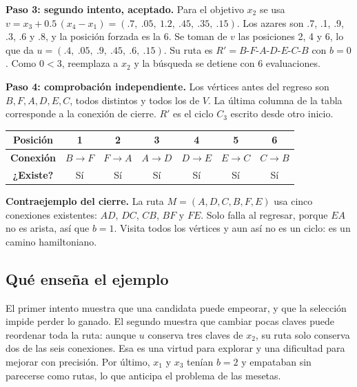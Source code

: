 \documentclass[letterpaper,12pt]{report}
\begin{document}
\noindent\textbf{Paso 3: segundo intento, aceptado.} Para el objetivo $x_2$ se usa $v=x_3+0.5\,(x_4-x_1)=(.7,\ .05,\ 1.2,\ .45,\ .35,\ .15)$. Los azares son .7, .1, .9, .3, .6 y .8, y la posición forzada es la 6. Se toman de $v$ las posiciones 2, 4 y 6, lo que da $u=(.4,\ .05,\ .9,\ .45,\ .6,\ .15)$. Su ruta es $R'=B\text{-}F\text{-}A\text{-}D\text{-}E\text{-}C\text{-}B$ con $b=0$. Como $0<3$, reemplaza a $x_2$ y la búsqueda se detiene con 6 evaluaciones.

\noindent\textbf{Paso 4: comprobación independiente.} Los vértices antes del regreso son $B,F,A,D,E,C$, todos distintos y todos los de $V$. La última columna de la tabla corresponde a la conexión de cierre. $R'$ es el ciclo $C_3$ escrito desde otro inicio.

\begin{center}
\small
\begin{tabular}{ccccccc}
\toprule
\textbf{Posición} & 1 & 2 & 3 & 4 & 5 & 6\\
\midrule
\textbf{Conexión} & $B\!\to\!F$ & $F\!\to\!A$ & $A\!\to\!D$ & $D\!\to\!E$ & $E\!\to\!C$ & $C\!\to\!B$\\
\textbf{¿Existe?} & Sí & Sí & Sí & Sí & Sí & Sí\\
\bottomrule
\end{tabular}
\end{center}

\noindent\textbf{Contraejemplo del cierre.} La ruta $M=(A,D,C,B,F,E)$ usa cinco conexiones existentes: $AD$, $DC$, $CB$, $BF$ y $FE$. Solo falla al regresar, porque $EA$ no es arista, así que $b=1$. Visita todos los vértices y aun así no es un ciclo: es un camino hamiltoniano.


\subsection{Qué enseña el ejemplo}
El primer intento muestra que una candidata puede empeorar, y que la selección impide perder lo ganado. El segundo muestra que cambiar pocas claves puede reordenar toda la ruta: aunque $u$ conserva tres claves de $x_2$, su ruta solo conserva dos de las seis conexiones. Esa es una virtud para explorar y una dificultad para mejorar con precisión. Por último, $x_1$ y $x_3$ tenían $b=2$ y empataban sin parecerse como rutas, lo que anticipa el problema de las mesetas.
\end{document}
